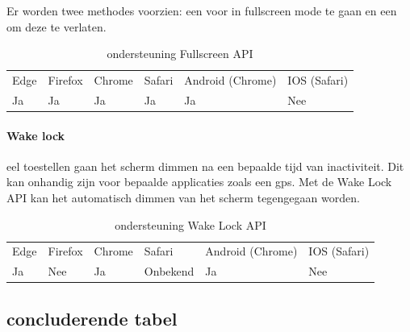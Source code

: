 Er worden twee methodes voorzien: een voor in fullscreen mode te gaan en een om deze te verlaten.

\begin{table}[H]
	\begin{tabular}{llllll}
		Edge & Firefox & Chrome & Safari & Android (Chrome) & IOS (Safari) \\
		Ja   & Ja      &  Ja   & Ja     & Ja               & Nee          
	\end{tabular}	
	\caption{ondersteuning  Fullscreen API  }
\end{table}


\paragraph{Wake lock }
eel toestellen gaan het scherm dimmen na een bepaalde tijd van inactiviteit. Dit kan onhandig zijn voor bepaalde applicaties zoals een gps. Met de Wake Lock API \autocite{Bogdanovich2020} kan het automatisch dimmen van het scherm tegengegaan worden.

\begin{table}[H]
	\centering
	\begin{tabular}{llllll}
		Edge & Firefox & Chrome & Safari & Android (Chrome) & IOS (Safari) \\
		Ja   & Nee      &  Ja   & Onbekend     & Ja               & Nee          
	\end{tabular}	
	\caption{ondersteuning  Wake Lock API  }
\end{table}

\subsection{concluderende tabel}

